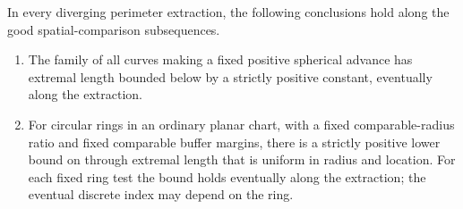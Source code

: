 \begin{corollary}\label{conf:raw-el-budgets}
In every diverging perimeter extraction, the following conclusions hold along the good
spatial-comparison subsequences.
\begin{enumerate}
\item The family of all curves making a fixed positive spherical advance has extremal length
bounded below by a strictly positive constant, eventually along the extraction.
\item For circular rings in an ordinary planar chart, with a fixed
comparable-radius ratio and fixed comparable buffer margins, there is a
strictly positive lower bound on through extremal length that is uniform
in radius and location. For each fixed ring test the bound holds
eventually along the extraction; the eventual discrete index may depend
on the ring.
\end{enumerate}
\end{corollary}
